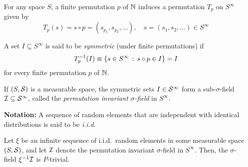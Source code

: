 For any space $S$, a finite permutation $p$ of $\N$ induces a permutation $T_p$ on $S^{\infty}$ given by
\[ T_p(s) = s \circ p = (s_{p_1}, s_{p_2}, \ldots), \quad s = (s_1, s_2, \ldots) \in S^{\infty} \]

\begin{definition}
    A set $I \subseteq S^{\infty}$ is said to be \emph{symmetric} (under finite permutations) if
    \[ T_p^{-1}(I) \equiv \{s \in S^{\infty} \col s \circ p \in I\} = I \]
    for every finite permutation $p$ of $\N$.
\end{definition}

\begin{definition}
    If $(S, \cal{S})$ is a measurable space, the symmetric sets $I \in \cal{S}^{\infty}$ form a sub-$\sigma$-field $\cal{I} \subseteq \cal{S}^{\infty}$, called the \emph{permutation invariant $\sigma$-field} in $S^{\infty}$.
\end{definition}

\textbf{Notation:} A sequence of random elements that are independent with identical distributions is said to be \emph{i.i.d.}

\begin{lemma}
    Let $\xi$ be an infinite sequence of i.i.d.\ random elements in some measurable space $(S, \cal{S})$, and let $\cal{I}$ denote the permutation invariant $\sigma$-field in $S^{\infty}$. Then, the $\sigma$-field $\xi^{-1}\cal{I}$ is $P$-trivial.
\end{lemma}
